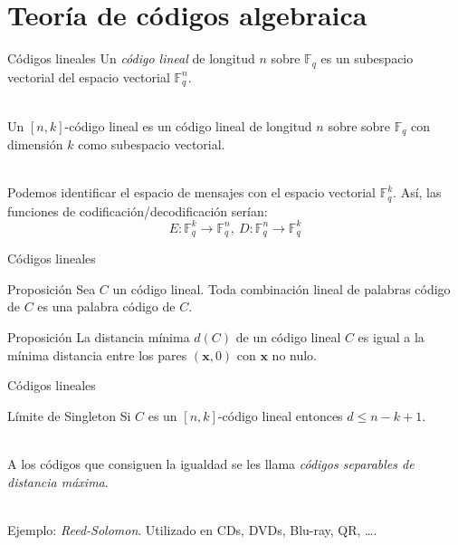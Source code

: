 \documentclass[aspectratio=43,14pt,spanish]{beamer}
\newcommand{\x}{\mathbf{x}}
\newcommand{\Fq}{\mathbb{F}_q}
\newcommand{\Fqn}{\mathbb{F}_q^n}
\theoremstyle{definition} %
\begin{document}
    \section{Teoría de códigos algebraica}
    \begin{frame}{Códigos lineales}
        Un \emph{código lineal}  de longitud $n$ sobre $\Fq$ es un subespacio vectorial del espacio vectorial $\Fqn$.

        \ \\

        Un $[n, k]$-código lineal es un código lineal de longitud $n$ sobre sobre $\Fq$ con dimensión $k$ como subespacio vectorial.

        \ \\

        Podemos identificar el espacio de mensajes con el espacio vectorial $\mathbb{F}_q^k$. Así, las funciones de codificación/decodificación serían:
        $$
            E: \mathbb{F}_q^k \to \mathbb{F}_q^n, \
            D: \mathbb{F}_q^n \to \mathbb{F}_q^k
        $$
    \end{frame}

    \begin{frame}{Códigos lineales}
        \begin{alertblock}{Proposición}
            Sea $C$ un código lineal. Toda combinación lineal de palabras código de $C$ es una palabra código de $C$.
        \end{alertblock}

        \begin{alertblock}{Proposición}
            La distancia mínima $d(C)$ de un código lineal $C$ es igual a la mínima distancia entre los pares $(\x, 0)$ con $\x$ no nulo.
        \end{alertblock}
    \end{frame}

    \begin{frame}{Códigos lineales}
        \begin{alertblock}{Límite de Singleton}
            Si $C$ es un $[n, k]$-código lineal entonces $d \leq n - k + 1$.
        \end{alertblock}

        \ \\

        A los códigos que consiguen la igualdad se les llama \emph{códigos separables de distancia máxima}.

        \ \\

        Ejemplo: \emph{Reed-Solomon}. Utilizado en CDs, DVDs, Blu-ray, QR, \dots.
    \end{frame}
\end{document}
